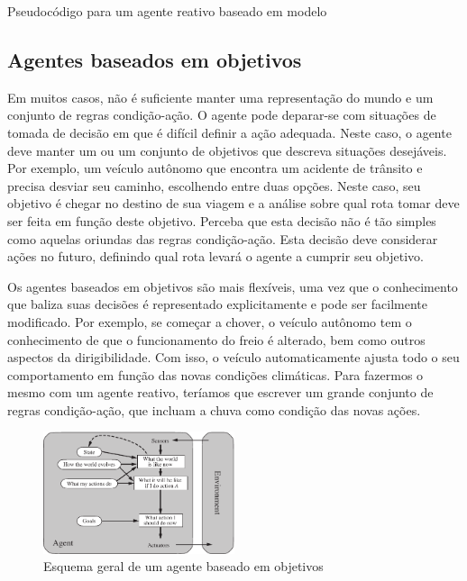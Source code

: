 \begin{algorithm}[h]
	\DontPrintSemicolon
	
	
	\caption{Pseudocódigo para um agente reativo baseado em modelo}
	\label{alg:agente-reativo-baseado-modelo}
\end{algorithm}

\subsection{Agentes baseados em objetivos}

Em muitos casos, não é suficiente manter uma representação do mundo e um conjunto de regras condição-ação. O agente pode deparar-se com situações de tomada de decisão em que é difícil definir a ação adequada. Neste caso, o agente deve manter um ou um conjunto de objetivos que descreva situações desejáveis. Por exemplo, um veículo autônomo que encontra um acidente de trânsito e precisa desviar seu caminho, escolhendo entre duas opções. Neste caso, seu objetivo é chegar no destino de sua viagem e a análise sobre qual rota tomar deve ser feita em função deste objetivo. Perceba que esta decisão não é tão simples como aquelas oriundas das regras condição-ação. Esta decisão deve considerar ações no futuro, definindo qual rota levará o agente a cumprir seu objetivo.

Os agentes baseados em objetivos são mais flexíveis, uma vez que o conhecimento que baliza suas decisões é representado explicitamente e pode ser facilmente modificado. Por exemplo, se começar a chover, o veículo autônomo tem o conhecimento de que o funcionamento do freio é alterado, bem como outros aspectos da dirigibilidade. Com isso, o veículo automaticamente ajusta todo o seu comportamento em função das novas condições climáticas. Para fazermos o mesmo com um agente reativo, teríamos que escrever um grande conjunto de regras condição-ação, que incluam a chuva como condição das novas ações.

\begin{figure}[h]
	\centering
	\includegraphics[width=0.5\textwidth]{img/agente-baseado-objetivos}
	\caption{Esquema geral de um agente baseado em objetivos}
	\label{fig:agente-baseado-objetivos}
\end{figure}

